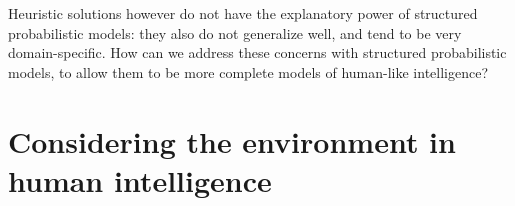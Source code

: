Heuristic solutions however do not have the explanatory power of structured probabilistic models: they also do not generalize well, and tend to be very domain-specific. How can we address these concerns with structured probabilistic models, to allow them to be more complete models of human-like intelligence?




\section*{Considering the environment in human intelligence}

